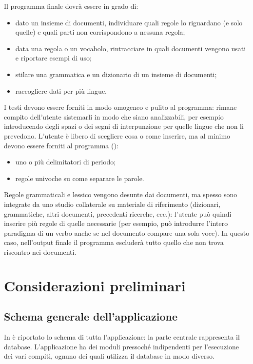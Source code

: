 \documentclass[twoside,stylearticle,11pt,filologia,it,article,bibsection]{spinoza}
\begin{document}
Il programma finale dovrà essere in grado di:
\begin{itemize}
\item dato un insieme di documenti, individuare quali regole lo
  riguardano (e solo quelle) e quali parti non corrispondono a nessuna
  regola;
\item data una regola o un vocabolo, rintracciare in quali documenti
  vengono usati e riportare esempi di uso;
\item stilare una grammatica e un dizionario di un insieme di documenti;
\item raccogliere dati per più lingue.
\end{itemize}

I testi devono essere forniti in modo omogeneo e pulito al programma:
rimane compito dell'utente sistemarli in modo che siano analizzabili,
per esempio introducendo degli spazi o dei segni di interpunzione per
quelle lingue che non li prevedono. L'utente è libero di scegliere
cosa o come inserire, ma al minimo devono essere forniti al programma
(\vedi {}):
\begin{itemize}
\item uno o più delimitatori di periodo;
\item regole univoche su come separare le parole.
\end{itemize}

Regole grammaticali e lessico vengono desunte dai documenti, ma spesso
sono integrate da uno studio collaterale su materiale di riferimento
(dizionari, grammatiche, altri documenti, precedenti ricerche, ecc.):
l'utente può quindi inserire più regole di quelle necessarie (per
esempio, può introdurre l'intero paradigma di un verbo anche se nel
documento compare una sola voce). In questo caso, nell'output finale
il programma escluderà tutto quello che non trova riscontro nei
documenti.

\section{Considerazioni preliminari}
\label{sec:struttura}

\subsection{Schema generale dell'applicazione}

In  è riportato lo schema di tutta l'applicazione:
la parte centrale rappresenta il database. L'applicazione ha dei
moduli pressoché indipendenti per l'esecuzione dei vari compiti,
ognuno dei quali utilizza il database in modo diverso.
\end{document}
